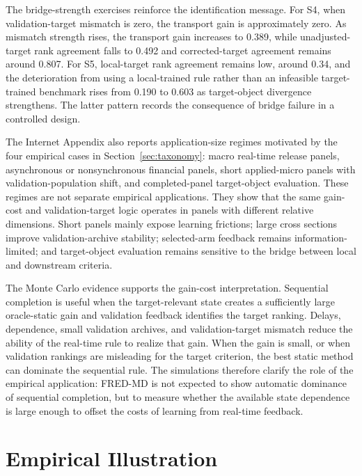 \documentclass[a4paper, 12pt]{article}
\theoremstyle{plain}
\theoremstyle{remark}
\newcommand{\1}{\mathbf{1}}
\begin{document}
The bridge-strength exercises reinforce the identification message. For S4, when validation-target mismatch is zero, the transport gain is approximately zero. As mismatch strength rises, the transport gain increases to 0.389, while unadjusted-target rank agreement falls to 0.492 and corrected-target agreement remains around 0.807. For S5, local-target rank agreement remains low, around 0.34, and the deterioration from using a local-trained rule rather than an infeasible target-trained benchmark rises from 0.190 to 0.603 as target-object divergence strengthens. The latter pattern records the consequence of bridge failure in a controlled design.

The Internet Appendix also reports application-size regimes motivated by the four empirical cases in Section~\ref{sec:taxonomy}: macro real-time release panels, asynchronous or nonsynchronous financial panels, short applied-micro panels with validation-population shift, and completed-panel target-object evaluation. These regimes are not separate empirical applications. They show that the same gain-cost and validation-target logic operates in panels with different relative dimensions. Short panels mainly expose learning frictions; large cross sections improve validation-archive stability; selected-arm feedback remains information-limited; and target-object evaluation remains sensitive to the bridge between local and downstream criteria.

The Monte Carlo evidence supports the gain-cost interpretation. Sequential completion is useful when the target-relevant state creates a sufficiently large oracle-static gain and validation feedback identifies the target ranking. Delays, dependence, small validation archives, and validation-target mismatch reduce the ability of the real-time rule to realize that gain. When the gain is small, or when validation rankings are misleading for the target criterion, the best static method can dominate the sequential rule. The simulations therefore clarify the role of the empirical application: FRED-MD is not expected to show automatic dominance of sequential completion, but to measure whether the available state dependence is large enough to offset the costs of learning from real-time feedback.


\section{Empirical Illustration}
\label{sec:empirical-illustration}
\end{document}

